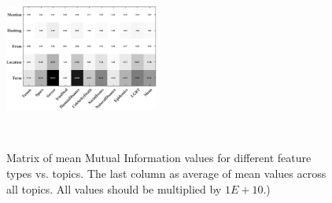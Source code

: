 \begin{figure}[t!]
\centering
\includegraphics[width=0.45\textwidth, height=60mm]{images/avgMI_gray.pdf}
\caption{Matrix of mean Mutual Information values for different feature types vs. topics.  The last column as average of mean values across all topics.  All values should be multiplied by $1E+10$.)}
\label{fig:avgMI}
\end{figure}

